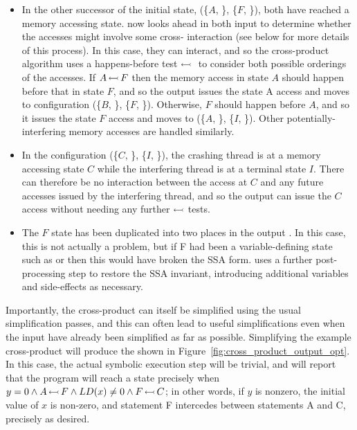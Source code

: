 \begin{itemize}
\item In the other successor of the initial state, (\{$A$, {\false}\},
  \{$F$, {\false}\}), both {\StateMachines} have reached a memory
  accessing state.  {\Technique} now looks ahead in both input
  {\StateMachines} to determine whether the accesses might involve
  some cross-{\StateMachine} interaction (see below for more details
  of this process).  In this case, they can interact, and so the
  cross-product algorithm uses a happens-before test
  $\leftarrowtail{}$ to consider both possible orderings of the
  accesses.  If $A\,{\leftarrowtail}\,F$ then the memory access in state
  $A$ should happen before that in state $F$, and so the output
  {\StateMachine} issues the state A access and moves to configuration
  (\{$B$, {\true}\}, \{$F$, {\false}\}).  Otherwise, $F$ should happen
  before $A$, and so it issues the state $F$ access and moves to
  (\{$A$, {\false}\}, \{$I$, {\true}\}).  Other
  potentially-interfering memory accesses are handled similarly.

\item In the configuration (\{$C$, {\true}\}, \{$I$, {\true}\}),
  the crashing thread {\StateMachine} is at a memory accessing state
  $C$ while the interfering thread {\StateMachine} is at a terminal
  state $I$.  There can therefore be no interaction between the access
  at $C$ and any future accesses issued by the interfering thread, and
  so the output {\StateMachine} can issue the $C$ access without needing
  any further $\leftarrowtail$ tests.

\item The $F$ state has been duplicated into two places in the output
  {\StateMachine}.  In this case, this is not actually a problem, but
  if F had been a variable-defining state such as  or
   then this would have broken the SSA form.  {\Technique}
  uses a further post-processing step to restore the SSA invariant,
  introducing additional variables and \state{$\Phi$} side-effects as
  necessary.
\end{itemize}

Importantly, the cross-product {\StateMachine} can itself be
simplified using the usual {\StateMachine} simplification passes, and
this can often lead to useful simplifications even when the input
{\StateMachines} have already been simplified as far as possible.
Simplifying the example cross-product {\StateMachine} will produce the
{\StateMachine} shown in Figure~\ref{fig:cross_product_output_opt}.
In this case, the actual symbolic execution step will be trivial, and
will report that the program will reach a {\stCrash} state precisely
when $y = 0 \wedge A\,{\leftarrowtail}\,F \wedge LD(x) \not= 0 \wedge
F\,{\leftarrowtail}\,C$; in other words, if $y$ is nonzero, the initial
value of $x$ is non-zero, and statement F intercedes between
statements A and C, precisely as desired.

